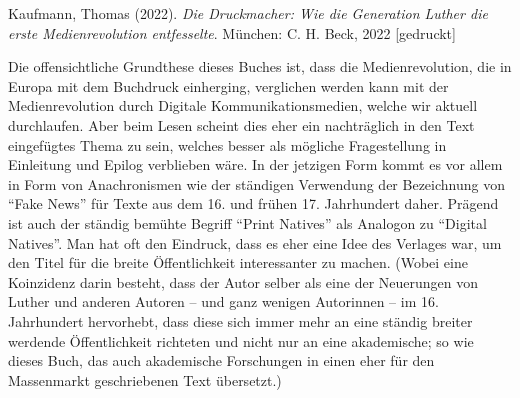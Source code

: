 \documentclass[a4paper,
fontsize=11pt,
oneside,
numbers=noperiodatend,
parskip=half-,
bibliography=totoc,
final
]{scrartcl}
\begin{document}
\pagebreak
Kaufmann, Thomas (2022). \emph{Die Druckmacher: Wie die Generation
Luther die erste Medienrevolution entfesselte}. München: C. H. Beck,
2022 {[}gedruckt{]}

Die offensichtliche Grundthese dieses Buches ist, dass die
Medienrevolution, die in Europa mit dem Buchdruck einherging, verglichen
werden kann mit der Medienrevolution durch Digitale
Kommunikationsmedien, welche wir aktuell durchlaufen. Aber beim Lesen
scheint dies eher ein nachträglich in den Text eingefügtes Thema zu
sein, welches besser als mögliche Fragestellung in Einleitung und Epilog
verblieben wäre. In der jetzigen Form kommt es vor allem in Form von
Anachronismen wie der ständigen Verwendung der Bezeichnung von
\enquote{Fake News} für Texte aus dem 16. und frühen 17. Jahrhundert
daher. Prägend ist auch der ständig bemühte Begriff \enquote{Print
Natives} als Analogon zu \enquote{Digital Natives}. Man hat oft den
Eindruck, dass es eher eine Idee des Verlages war, um den Titel für die
breite Öffentlichkeit interessanter zu machen. (Wobei eine Koinzidenz
darin besteht, dass der Autor selber als eine der Neuerungen von Luther
und anderen Autoren -- und ganz wenigen Autorinnen -- im 16. Jahrhundert
hervorhebt, dass diese sich immer mehr an eine ständig breiter werdende
Öffentlichkeit richteten und nicht nur an eine akademische; so wie
dieses Buch, das auch akademische Forschungen in einen eher für den
Massenmarkt geschriebenen Text übersetzt.)
\end{document}
